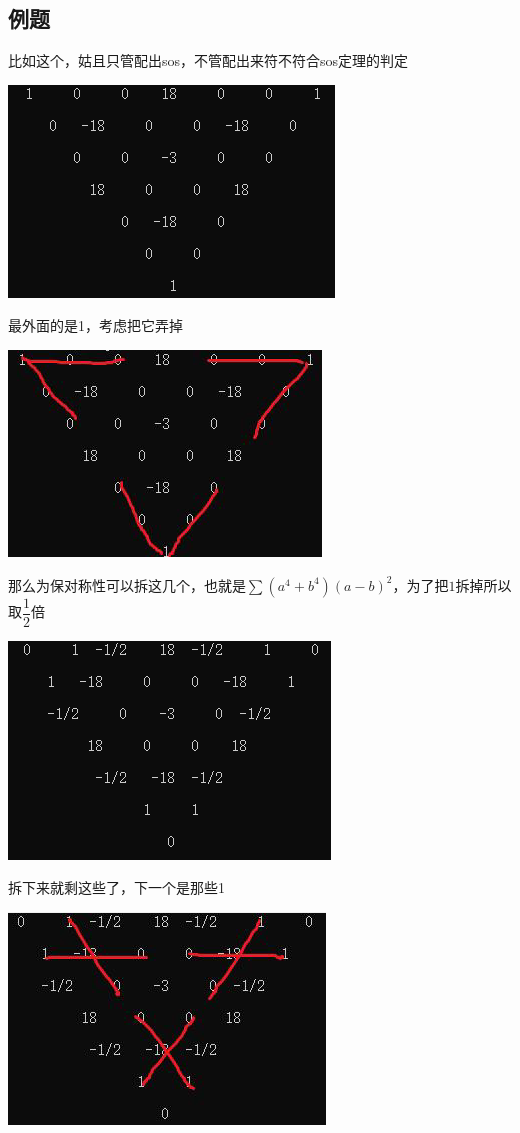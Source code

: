 \documentclass[UTF8]{ctexart}
\begin{document}
\subsection{例题}
比如这个，姑且只管配出sos，不管配出来符不符合sos定理的判定
\begin{center}
	\includegraphics[width=0.5\linewidth]{38}
\end{center}
最外面的是1，考虑把它弄掉
\begin{center}
	\includegraphics[width=0.5\linewidth]{39}
\end{center}
那么为保对称性可以拆这几个，也就是$ \displaystyle \sum (a^4+b^4)(a-b)^2 $，为了把$ 1 $拆掉所以取$ \dfrac{1}{2} $倍
\begin{center}
	\includegraphics[width=0.5\linewidth]{40}
\end{center}
拆下来就剩这些了，下一个是那些1
\begin{center}
	\includegraphics[width=0.5\linewidth]{41}
\end{center}
\end{document}
